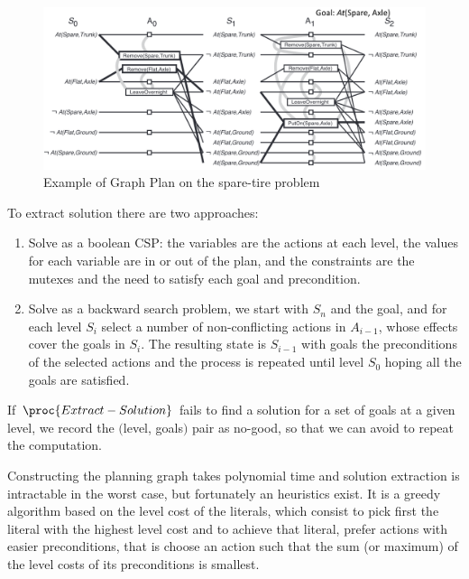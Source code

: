 \begin{figure}
	\includegraphics[width=\textwidth]{Images/exampleGraphPlan}
	\caption{Example of Graph Plan on the spare-tire problem}
	\label{img:exampleGraphPlan}
\end{figure}
To extract solution there are two approaches:
\begin{enumerate}
    \item Solve as a boolean CSP: the variables are the actions at each level, the values for 
	  each variable are in or out of the plan, and the constraints are the mutexes and the 
	  need to satisfy each goal and precondition.
    \item Solve as a backward search problem, we start with $S_n$ and the goal, and for each level
	  $S_i$ select a number of non-conflicting actions in $A_{i-1}$, whose effects cover the 
	  goals in $S_i$.\newline
	  The resulting state is $S_{i-1}$ with goals the preconditions of the selected actions
	  and the process is repeated until level $S_0$ hoping all the goals are satisfied.
\end{enumerate}
If $\proc{Extract-Solution}$ fails to find a solution for a set of goals at a given level, we 
record the $($level, goals$)$ pair as no-good, so that we can avoid to repeat the computation.

Constructing the planning graph takes polynomial time and solution extraction is intractable in
the worst case, but fortunately an heuristics exist.\newline
It is a greedy algorithm based on the level cost of the literals, which consist to pick first
the literal with the highest level cost and to achieve that literal, prefer actions with easier
preconditions, that is choose an action such that the sum (or maximum) of the level costs of 
its preconditions is smallest.

